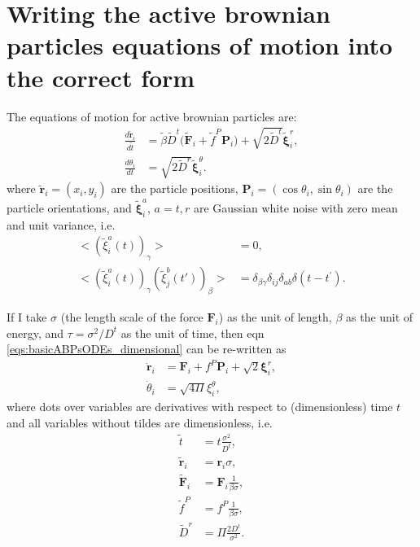 \documentclass[twocolumn,amsmath,amssymb,aps]{revtex4-1}%
\begin{document}
\section{Writing the active brownian particles equations of motion into
  the correct form}

The equations of motion for active brownian particles are:
\begin{subequations}
  \label{eqs:basicABPsODEs_dimensional}
  \begin{align}
    \frac{d\tilde{\bm{r}}_i}{d\tilde{t}}&=\tilde{\beta}
    \tilde{D}^t\big(\tilde{\bm{F}}_i
    +\tilde{f}^P\bm{P}_i\big)
    +\sqrt{2\tilde{D}^t}\tilde{\bm{\xi}}^r_i,\\
    \frac{d\theta_i}{dt}&=\sqrt{2\tilde{D}^r}
    \tilde{\bm{\xi}}^{\theta}_i.
  \end{align}
\end{subequations}
where $\tilde{\bm{r}}_i=(x_i,y_i)$ are the particle positions,
$\bm{P}_i=(\cos\theta_i,\sin\theta_i)$ are the particle orientations,
and $\tilde{\bm{\xi}}^{a}_i$, $a=t,r$ are Gaussian white noise
with zero mean and unit variance, i.e.
\begin{subequations}
  \begin{align}
    \big<(\tilde{\xi}^a_i(t))_{\gamma}\big>&=0,\\
    \big<(\tilde{\xi}^a_i(t))_{\gamma}(\tilde{\xi}^b_j(t'))_{\beta}\big>
    &=\delta_{\beta\gamma}\delta_{ij}\delta_{ab}\delta(t-t^{\prime}).
  \end{align}
\end{subequations}

If I take $\sigma$ (the length scale of the force $\bm{F}_i$) as the unit of
length, $\beta$ as the unit of energy, and $\tau = \sigma^2/D^t$ as the unit
of time, then eqn \ref{eqs:basicABPsODEs_dimensional} can be re-written as
\begin{subequations}
  \label{eqs:basicABPsODEs}
  \begin{align}
    \dot{\bm{r}}_i&=\bm{F}_i
    +f^P\bm{P}_i
    +\sqrt{2}\bm{\xi}^{r}_i,\label{eq:micro_pos}\\
    \dot\theta_i&=\sqrt{4\Pi}\xi^{\theta}_i,\label{eq:micro_theta}
  \end{align}
\end{subequations}
where dots over variables are derivatives with respect to (dimensionless)
time $t$ and all variables without tildes are dimensionless, i.e.
\begin{subequations}
  \label{eqs:dimensionless}
  \begin{align}
    \tilde{t} &= t\frac{\sigma^2}{D^t},\\
    \tilde{\bm{r}}_i &= \bm{r}_i\sigma,\\
    \tilde{\bm{F}}_i & = \bm{F}_i\frac{1}{\beta\sigma},\\
    \tilde{f}^P &= f^P\frac{1}{\beta\sigma},\\
    \tilde{D}^r &= \Pi \frac{2D^t}{\sigma^2}.
  \end{align}
\end{subequations}
\end{document}
